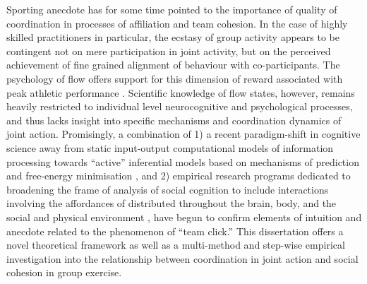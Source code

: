 Sporting anecdote has for some time pointed to the importance of quality of coordination in processes of affiliation and team cohesion.  In the case of highly skilled practitioners in particular, the ecstasy of group activity appears to be contingent not on mere participation in joint activity, but on the perceived achievement of fine grained alignment of behaviour with co-participants.  The psychology of flow offers support for this dimension of reward associated with peak athletic performance \citep{Jackson1995}. Scientific knowledge of flow states, however, remains heavily restricted to individual level neurocognitive and psychological processes, and thus lacks insight into specific mechanisms and coordination dynamics of joint action.  Promisingly, a combination of 1) a recent paradigm-shift in cognitive science away from static input-output computational models of information processing towards ``active'' inferential models based on mechanisms of prediction and free-energy minimisation \citep{Friston2010,Clark2013}, and 2) empirical research programs dedicated to broadening the frame of analysis of social cognition to include interactions involving the affordances of distributed throughout the brain, body, and the social and physical environment \citep{Sebanz2006,Semin2008}, have begun to confirm elements of intuition and anecdote related to the phenomenon of ``team click.''  This dissertation offers a novel theoretical framework as well as a multi-method and step-wise empirical investigation into the relationship between coordination in joint action and social cohesion in group exercise.

